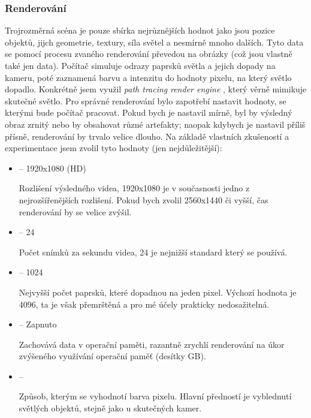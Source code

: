 \newpage

\subsubsection{Renderování}\label{sc:renderovani}
{Trojrozměrná scéna je pouze sbírka nejrůznějších hodnot jako jsou pozice objektů, jijch geometrie, textury, síla světel a nesmírně mnoho dalších. Tyto data se pomocí procesu zvaného renderování převedou na obrázky (což jsou vlastně také jen data). Počítač simuluje odrazy paprsků světla a jejich dopady na kameru, poté zaznamená barvu a intenzitu do hodnoty pixelu, na který světlo dopadlo. Konkrétně jsem využil \textit{path tracing} \textit{render engine} , který věrně mimikuje skutečné světlo.}\odst
{Pro správné renderování bylo zapotřebí nastavit hodnoty, se kterými bude počítač pracovat. Pokud bych je nastavil mírně, byl by výsledný obraz zrnitý nebo by obsahovat různé artefakty; naopak kdybych je nastavil příliš přísně, renderování by trvalo velice dlouho. Na základě vlastních zkušeností a experimentace jsem zvolil tyto hodnoty (jen nejdůležitější): }

\begin{itemize}
    \item { -- 1920x1080 (HD)}\par
        {Rozlišení výsledného videa, 1920x1080 je v současnosti jedno z nejrozšířenějších rozlišení. Pokud bych zvolil 2560x1440 či vyšší, čas renderování by se velice zvýšil.}
    \item { -- 24}\par
        {Počet snímků za sekundu videa, 24 je nejnižší standard který se používá.}
    \item { -- 1024}\par
        {Nejvyšší počet paprsků, které dopadnou na jeden pixel. Výchozí hodnota je 4096, ta je však přemrštěná a pro mé účely prakticky nedosažitelná.}
    \item { -- Zapnuto}\par
        {Zachovává data v operační paměti, razantně zrychlí renderování na úkor zvýšeného využívání operační paměť (desítky GB).}
    \item { -- }\par
        {Způsob, kterým se vyhodnotí barva pixelu. Hlavní předností  je vyblednutí světlých objektů, stejně jako u skutečných kamer.}
\end{itemize}

